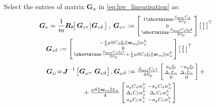 \begin{algorithm}
\begin{algorithmic}[1]
\State Select the entries of matrix $\boldsymbol{G}_w$ in \eqref{eq:lpv_linearisation} as: 
\begin{align}
\nonumber
& \boldsymbol{G}_{v} = \frac{1}{m}    \boldsymbol{R}_\theta \!\! \left[ \!\! \begin{array}{c|c} 
     \boldsymbol{G}_{v\tau}\!\! & \! \! \boldsymbol{G}_{v\delta} 
    \end{array} \!\! \right ], \; \boldsymbol{G}_{v\tau} :=      \smallmat{
   1 \shortminus \frac{S_{\text{wet}} C_{\text{d}}}{4S_{\text{p}}}\\ 0 \\ \shortminus\frac{S_{\text{wet}} C_{\ell} \xi_{\text{f}}\delta}{2S_{\text{p}}} } \smallmat{ 1 \\ 1}^\top                     \\
   \label{eq:Gv_ALG_luca}
   &\quad  \boldsymbol{G}_{v\delta} := 
   \smallmat{
        -   \frac{1}{4}\rho S C_{\text{d}} \xi_{\text{f}} \lVert \boldsymbol{w}_{\text{eq}} \rVert w^{\text{b}}_{z}\\0 \\\shortminus \frac{S_{\text{wet}}  C_{\ell} \xi_{\text{f}}\tau}{2S_{\text{p}}} + \frac{1}{4}\rho S C_{\ell}  \xi_{\text{f}} \lVert \boldsymbol{w}_{\text{eq}} \rVert w^{\text{b}}_{x}
    } \smallmat{ 1 \\ 1}^\top 
\end{align}
\begin{align}
\nonumber
     \boldsymbol{G}_{\omega} \! &= \!  \boldsymbol{J}^{-1} \begin{bmatrix}\boldsymbol{G}_{\omega \tau} \!\! & \!\! \boldsymbol{G}_{\omega \delta} 
    \end{bmatrix}, 
    \boldsymbol{G}_{\omega \delta} :=
      \tfrac{S_{\text{wet}}C_{\ell}\tau}{4S_{\text{p}}} 
      \left[ \begin{smallmatrix} a_{y} \xi_{\text{f}} & - a_{y} \xi_{\text{f}}\\
                 \Delta_{\text{r}}\xi_{\text{m}} & \Delta_{\text{r}}\xi_{\text{m}}\\
                 0 & 0 \end{smallmatrix} \right] + 
    \\
\label{eq:Gomega_ALG_Luca}
    &\qquad \qquad +  \tfrac{\rho S \lVert \boldsymbol{w}_{\mathrm{eq}} \rVert\xi_{\text{m}}}{4}
    \left[ \begin{smallmatrix} a_{y} C_{\text{d}} w^{\text{b}}_{x} & -  a_{y} C_{\text{d}} w^{\text{b}}_{x} \\
    \Delta_{\text{r}} C_{\ell} w^{\text{b}}_{x} & \Delta_{\text{r}} C_{\ell} w^{\text{b}}_{x} \\
    a_{y} C_{\ell} w^{\text{b}}_{z} & - a_{y} C_{\ell} w^{\text{b}}_{z} 
 \end{smallmatrix} \right]
\end{align}
\end{algorithmic}
\end{algorithm}
